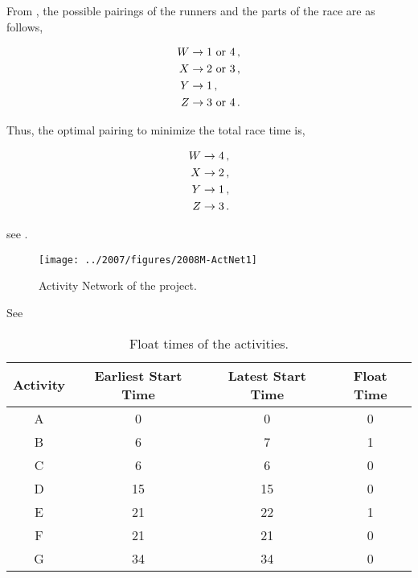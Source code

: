 \begin{subquestions}
From , the possible pairings of the runners and the parts of the race are as follows,

\begin{align}
	W & \rightarrow 1 ~\text{or} ~4 \,, \nonumber \\
	X & \rightarrow 2 ~\text{or} ~3 \,, \nonumber \\
	Y & \rightarrow 1 \,, \nonumber \\
	Z & \rightarrow 3 ~\text{or} ~4 \,.
\end{align}

Thus, the optimal pairing to minimize the total race time is,

\begin{align}
	W \rightarrow 4 \,, \nonumber \\
	X \rightarrow 2 \,, \nonumber \\
	Y \rightarrow 1 \,, \nonumber \\
	Z \rightarrow 3 \,.
\end{align}


\subquestion

see .

\begin{figure}
	\begin{center}
		\texttt{[image: ../2007/figures/2008M-ActNet1]}
		\caption{\label{2008M:q2:fig:ActNet1} Activity Network of the project.}
	\end{center}
\end{figure}


\subquestion 

\begin{subsubquestions}
	
\subsubquestion

See 

\begin{table}[ht]
	\centering
	\begin{tabular}{|c|c|c|c|}
		\hline
		Activity & Earliest Start Time & Latest Start Time & Float Time \\
		\hline
		A & 0 & 0 & 0 \\
		B & 6 & 7 & 1 \\
		C & 6 & 6 & 0 \\
		D & 15 & 15 & 0 \\
		E & 21 & 22 & 1 \\
		F & 21 & 21 & 0 \\
		G & 34 & 34 & 0 \\
		\hline
	\end{tabular}
	\caption{\label{2008M:q2:tab:ActNet2} Float times of the activities.}
\end{table} 


\end{subsubquestions}
\end{subquestions}
